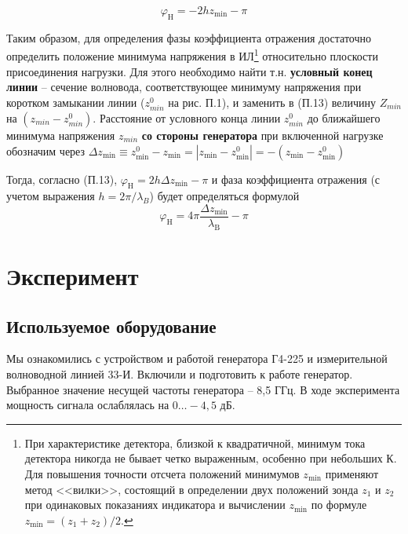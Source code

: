 \begin{equation}
	\varphi _ { \mathrm { H } } = - 2 h z _ { \mathrm { min } } - \pi
\end{equation}

Таким образом, для определения фазы коэффициента отражения достаточно определить положение минимума напряжения в ИЛ\footnote{При характеристике детектора, близкой к квадратичной, минимум тока детектора никогда не бывает четко выраженным, особенно при небольших К. Для повышения точности отсчета положений минимумов $z_{\min}$ применяют метод <<вилки>>, состоящий в определении двух положений зонда $z_1$ и $z_2$ при одинаковых показаниях индикатора и вычислении $z_{\min}$ по формуле $z_{\min}=(z_1+z_2)/2$.} относительно плоскости присоединения нагрузки. 
%
Для этого необходимо найти т.н. \textbf{условный конец линии} -- сечение волновода, соответствующее минимуму напряжения при коротком замыкании линии ($z^0_{min}$ на рис. П.1), и заменить в (П.13) величину $Z_{min}$ на $(z_{min}-z_{min}^0)$. 
Расстояние от условного конца линии $z^0_{min}$ до ближайшего минимума напряжения $z_{min}$ \textbf{со стороны генератора} при включенной нагрузке обозначим через 
$\Delta z _ { \min } \equiv z _ { \min } ^ { 0 } - z _ { \min } = \left| z _ { \min } - z _ { \min } ^ { 0 } \right| =- \left( z _ { \min } - z _ { \min } ^ { 0 } \right)$

Тогда, согласно (П.13),  $\varphi _ { \mathrm { H } } = 2 h \Delta z _ { \mathrm { min } } - \pi$ и фаза коэффициента отражения (с учетом выражения $h=2\pi/\lambda_B$) будет определяться формулой
\begin{equation}
	\varphi _ { \mathrm { H } } = 4 \pi \frac { \Delta z _ { \mathrm { min } } } { \lambda _ { \mathrm { B } } } - \pi
\end{equation}

\section{Эксперимент}

\subsection{Используемое оборудование}

Мы ознакомились с устройством и работой генератора Г4-225 и измерительной волноводной линией 33-И. Включили и подготовить к работе генератор. Выбранное значение несущей частоты генератора -- 8,5 ГГц. В ходе эксперимента мощность сигнала ослаблялась на $0\ldots-4,5$ дБ.

